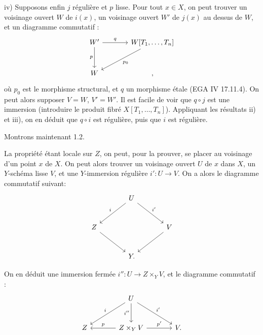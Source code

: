 
iv)
Supposons enfin $j$ régulière et $p$ lisse. Pour tout $x\in X$, on peut trouver un voisinage ouvert $W$ de $i(x)$, un voisinage ouvert $W'$ de $j(x)$ au dessus de $W$, et un diagramme commutatif :
\[
\begin{tikzcd}[column sep=large,row sep=large]
W' \arrow[r,"q"] \arrow[d,"p"'] & W[T_1,\ldots,T_n] \arrow[dl,"p_0"]\\
W & ,
\end{tikzcd}
\]
où $p_0$ est le morphisme structural, et $q$ un morphisme étale (EGA IV 17.11.4). On peut alors supposer $V=W$, $V'=W'$. Il est facile de voir que $q\circ j$ est une immersion (introduire le produit fibré $X[T_1,\ldots,T_n]$). Appliquant les résultats ii) et iii), on en déduit que $q\circ i$ est régulière, puis que $i$ est régulière.

Montrons maintenant 1.2.

La propriété étant locale sur $Z$, on peut, pour la prouver, se placer au voisinage d'un point $x$ de $X$. On peut alors trouver un voisinage ouvert $U$ de $x$ dans $X$, un $Y$-schéma lisse $V$, et une $Y$-immersion régulière $i':U\to V$. On a alors le diagramme commutatif suivant:
\[
\begin{tikzcd}[column sep=large,row sep=large]
& U \arrow[dl,"i"'] \arrow[dr,"i'"] &\\
Z \arrow[dr] && V \arrow[dl]\\
& Y . &
\end{tikzcd}
\]

On en déduit une immersion fermée $i'':U\to Z\times_Y V$, et le diagramme commutatif :
\[
\begin{tikzcd}[column sep=large,row sep=large]
& U \arrow[dl,"i"'] \arrow[d,"i''"'] \arrow[dr,"i'"] &\\
Z & Z\times_Y V \arrow[l,"p"'] \arrow[r,"p'"] & V.
\end{tikzcd}
\]
